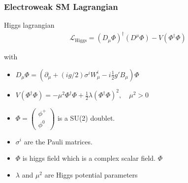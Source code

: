 \documentclass[11pt]{beamer}
\begin{document}
\begin{frame}
\frametitle{Electroweak SM Lagrangian}
Higgs lagrangian 
\begin{align}
\mathcal{L}_{\text{Higgs}}=(D_\mu \Phi)^\dagger (D^\mu \Phi)-V(\Phi^\dagger \Phi)
\end{align}

with
\begin{itemize}
	\item $D_\mu \Phi = \left(\partial_\mu+(ig/2)\sigma^iW^i_\mu-i\frac{1}{2} g' B_\mu \right) \Phi $
	\item $V(\Phi^\dagger \Phi)=-\mu^2 \Phi^\dagger \Phi +\frac{1}{2}  \lambda (\Phi^\dagger \Phi)^2, \quad \mu^2>0  $ 
	\item $\Phi=\left(\begin{array}{c}
	\phi^+ \\
	\phi^0
	\end{array} \right)  $ is a SU(2) doublet.
	\item $\sigma^i$ are the Pauli matrices.
\end{itemize}
 
\begin{itemize}
	\item $\Phi$ is higgs field which is a complex scalar field. $\Phi$
	\item $\lambda $ and $\mu^2$ are Higgs potential parameters
\end{itemize}
\end{frame}
\end{document}
